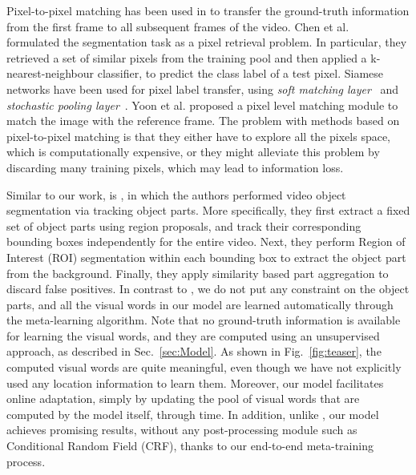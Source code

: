 \documentclass[10pt,twocolumn,letterpaper]{article}
\begin{document}
Pixel-to-pixel matching has been used in \cite{Chen_2018_CVPR, Hu_2018_ECCV, DAVIS2018-Interactive-2nd, Yoon_2017_ICCV} to transfer the ground-truth information from the first frame to all subsequent frames of the video.
Chen et al.~\cite{Chen_2018_CVPR} formulated the segmentation task as a pixel retrieval problem. In particular, they retrieved a set of similar pixels from the training pool and then applied a k-nearest-neighbour classifier, to predict the class label of a test pixel.
Siamese networks have been used for pixel label transfer, using {\it soft matching layer}~\cite{Hu_2018_ECCV} and {\it stochastic pooling layer}~\cite{DAVIS2018-Interactive-2nd}.
Yoon et al. \cite{Yoon_2017_ICCV} proposed a pixel level matching module to match the image with the reference frame. 
The problem with methods based on pixel-to-pixel matching is that they either have to explore all the pixels space, which is computationally expensive, or they might alleviate this problem by discarding many training pixels, which may lead to information loss.


Similar to our work, is \cite{Cheng_2018_CVPR}, in which the authors performed video object segmentation via tracking object parts. More specifically, they first extract a fixed set of object parts using region proposals, and track their corresponding bounding boxes independently for the entire video. Next, they perform Region of Interest (ROI) segmentation within each bounding box to extract the object part from the background. Finally, they apply similarity based part aggregation to discard false positives.
In contrast to \cite{Cheng_2018_CVPR}, we do not put any constraint on the object parts, and all the visual words in our model are learned automatically through the meta-learning algorithm. Note that no ground-truth information is available for learning the visual words, and they are computed using an unsupervised approach, as described in Sec.~\ref{sec:Model}. As shown in Fig.~\ref{fig:teaser}, the computed visual words are quite meaningful, even though we have not explicitly used any location information to learn them. 
Moreover, our model facilitates online adaptation, simply by updating the pool of visual words that are computed by the model itself, through time.
In addition, unlike \cite{Cheng_2018_CVPR}, our model achieves promising results, without any post-processing module such as Conditional Random Field (CRF), thanks to our end-to-end meta-training process. 
\end{document}
